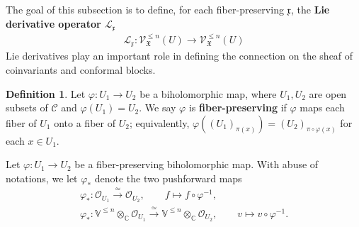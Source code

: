 \documentclass[11pt,b5paper,notitlepage]{article}
\theoremstyle{definition}
\newtheorem{df}{Definition}[section]
\theoremstyle{plain}
\newcommand{\mc}{\mathcal}
\newcommand{\ML}{\mathcal{L}}
\newcommand{\SV}{\mathscr{V}}
\newcommand{\xk}{\mathfrak x}
\newcommand{\Vbb}{\mathbb V}
\newcommand{\Cbb}{\mathbb C}
\newcommand{\<}{\left\langle}
\renewcommand{\>}{\right\rangle}
\newcommand{\MO}{\mathcal{O}}
\newcommand{\MU}{\mathcal{U}}
\newcommand{\MC}{\mathcal{C}}
\newcommand{\fx}{\mathfrak{X}}
\newcommand{\MV}{\mathcal{V}}
\numberwithin{equation}{section}
\begin{document}
The goal of this subsection is to define, for each fiber-preserving $\xk$, the \textbf{Lie derivative operator $\ML_\xk$}
\begin{align}\label{eqb15}
    \ML_\xk:\SV_\fx^{\leq n}(U)\rightarrow \SV_\fx^{\leq n}(U)
\end{align}
Lie derivatives play an important role in defining the connection on the sheaf of coinvariants and conformal blocks. 

\begin{df}
    Let $\varphi:U_1\rightarrow U_2$ be a biholomorphic map, where $U_1,U_2$ are open subsets of $\MC$ and $\varphi(U_1)=U_2$. We say $\varphi$ is \textbf{fiber-preserving} if $\varphi$ maps each fiber of $U_1$ onto a fiber of $U_2$; equivalently,  $\varphi((U_1)_{\pi(x)})=(U_2)_{\pi\circ \varphi(x)}$ for each $x\in U_1$.
\end{df}

Let $\varphi:U_1\rightarrow U_2$ be a fiber-preserving biholomorphic map. With abuse of notations, we let $\varphi_*$ denote the two pushforward maps
\begin{subequations}
\begin{gather}
    \varphi_*:\MO_{U_1}\xrightarrow{\simeq} \MO_{U_2},\qquad f\mapsto f\circ \varphi^{-1},\label{equiv1}\\
    \varphi_*:\Vbb^{\leq n}\otimes_\Cbb \MO_{U_1}\xrightarrow{\simeq} \Vbb^{\leq n}\otimes_\Cbb \MO_{U_2},\qquad v\mapsto v\circ \varphi^{-1}.\label{equiv2}
\end{gather}
\end{subequations}

\begin{comment}
Suppose that $\eta\in \MO(U_2)$ is univalent on each fiber. Then we have an equivalence 
\begin{align}
    (\eta,\pi)_*:\MO_{U_2}\xrightarrow{\simeq} \MO_{(\eta,\pi)(U_2)},\qquad f\mapsto f\circ (\eta,\pi)^{-1}.
\end{align}
Recall (cf. \cite[Sec. 1.7]{GZ1}) that the trivialization $\mc U_\varrho(\eta)=\eqref{eq175}$ gives a sheaf-isomorphism
\begin{equation}\label{equiv3}
    \begin{gathered}
     \MV_\varrho(\eta):\SV_\fx^{\leq n}\vert_{U_2} \xrightarrow{\simeq} \Vbb^{\leq n}\otimes_\Cbb \MO_{(\eta,\pi)(U_2)},\\
     \MV_\varrho(\eta)=(\eta,\pi)_* \MU_\varrho(\eta).
    \end{gathered}
\end{equation}
\end{comment}
\end{document}
